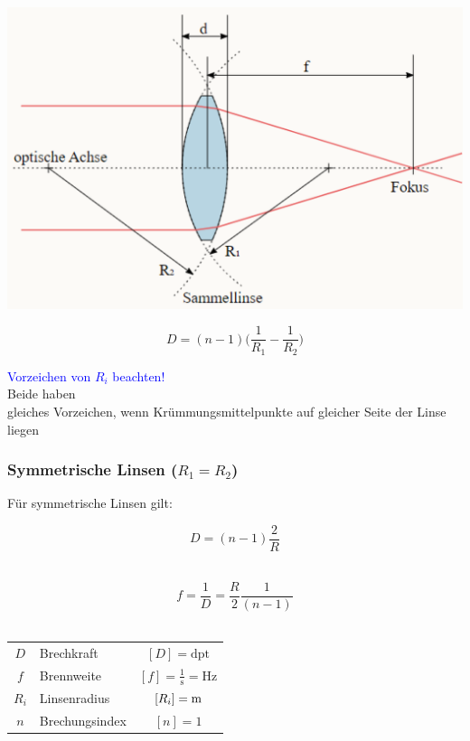 \begin{minipage}{0.52\linewidth}
\includegraphics[width=\linewidth]{Bilder/Wellen-Optik/Linsenschleifergleichung}
\end{minipage}
\hfill
\begin{minipage}{0.46\linewidth}
$$\boxed{D = (n-1)  \Big(  \frac{1}{R_1} - \frac{1}{R_2} \Big)  }$$

\textcolor{blue}{Vorzeichen von $R_i$ beachten!} \\
Beide haben \\
gleiches Vorzeichen, wenn Krümmungsmittelpunkte auf gleicher Seite der Linse liegen
\end{minipage}



\subsubsection{Symmetrische Linsen ($R_1 = R_2$)}

Für symmetrische Linsen gilt:

\begin{minipage}{0.48\linewidth}
$$\boxed{D = (n - 1)\frac{2}{R}}$$ \\
\end{minipage}
\hfill
\begin{minipage}{0.48\linewidth}
$$\boxed{f = \frac{1}{D} = \frac{R}{2}\frac{1}{(n - 1)}} $$ \\
\end{minipage}



\begin{tabular}{c l c}
	$D$ & Brechkraft & $[D] = \mathrm{dpt}$ \\
	$f$ & Brennweite & $[f] = \mathrm{\frac{1}{s} = Hz}$ \\
	$R_i$ & Linsenradius & $[R_i] = \mathrm{m}$ \\
	$n$ & Brechungsindex & $[n] = 1$ \\
\end{tabular}


